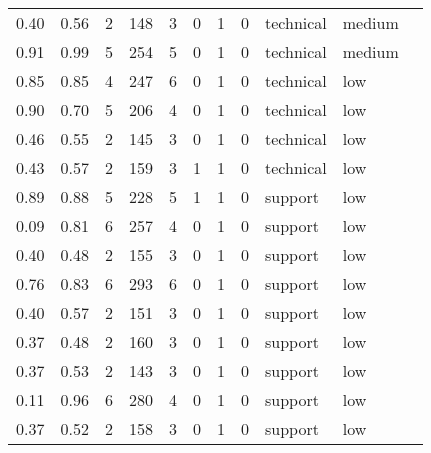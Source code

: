 \documentclass[11pt]{article}
\begin{document}
\begin{tabular}{r|llllllllll}
	 0.40       & 0.56       & 2          & 148        & 3          & 0          & 1          & 0          & technical  & medium    \\
	 0.91       & 0.99       & 5          & 254        & 5          & 0          & 1          & 0          & technical  & medium    \\
	 0.85       & 0.85       & 4          & 247        & 6          & 0          & 1          & 0          & technical  & low       \\
	 0.90       & 0.70       & 5          & 206        & 4          & 0          & 1          & 0          & technical  & low       \\
	 0.46       & 0.55       & 2          & 145        & 3          & 0          & 1          & 0          & technical  & low       \\
	 0.43       & 0.57       & 2          & 159        & 3          & 1          & 1          & 0          & technical  & low       \\
	 0.89       & 0.88       & 5          & 228        & 5          & 1          & 1          & 0          & support    & low       \\
	 0.09       & 0.81       & 6          & 257        & 4          & 0          & 1          & 0          & support    & low       \\
	 0.40       & 0.48       & 2          & 155        & 3          & 0          & 1          & 0          & support    & low       \\
	 0.76       & 0.83       & 6          & 293        & 6          & 0          & 1          & 0          & support    & low       \\
	 0.40       & 0.57       & 2          & 151        & 3          & 0          & 1          & 0          & support    & low       \\
	 0.37       & 0.48       & 2          & 160        & 3          & 0          & 1          & 0          & support    & low       \\
	 0.37       & 0.53       & 2          & 143        & 3          & 0          & 1          & 0          & support    & low       \\
	 0.11       & 0.96       & 6          & 280        & 4          & 0          & 1          & 0          & support    & low       \\
	 0.37       & 0.52       & 2          & 158        & 3          & 0          & 1          & 0          & support    & low       \\
\end{tabular}
\end{document}

